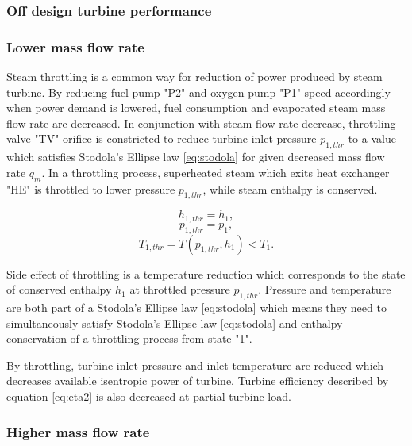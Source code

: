 \documentclass[openany]{book}
\begin{document}
	\subsubsection*{Off design turbine performance}
	
	\subsubsection*{Lower mass flow rate}
	
	Steam throttling is a common way for reduction of power produced by steam 
	turbine. By reducing fuel pump "P2" and oxygen pump "P1" speed accordingly 
	when power demand is lowered, fuel consumption and evaporated steam mass 
	flow rate are decreased. In conjunction with steam flow rate decrease, 
	throttling valve "TV" orifice is constricted to reduce turbine inlet 
	pressure $p_{1,thr}$ to a value which satisfies Stodola’s Ellipse law 
	\ref{eq:stodola} for given decreased mass flow rate $q_m$. In a throttling 
	process, superheated steam which exits heat exchanger "HE" is throttled to 
	lower pressure $p_{1,thr}$, while steam enthalpy is conserved.
	
	\begin{equation}\label{eq:ent_preserve1}
	h_{1,thr} = h_1,
	\end{equation}
	\begin{equation}\label{eq:ent_preserve2}
	p_{1,thr} = p_1,
	\end{equation}
	\begin{equation}\label{eq:ent_preserve3}
	T_{1,thr} = T(p_{1,thr},h_1) < T_1.
	\end{equation}
	
	Side effect of throttling is a temperature reduction which corresponds to 
	the state of conserved enthalpy $h_1$ at throttled pressure $p_{1,thr}$. 
	Pressure and temperature are both part of a Stodola’s Ellipse law 
	\ref{eq:stodola} which means they need to simultaneously satisfy Stodola’s 
	Ellipse law  \ref{eq:stodola}  and enthalpy conservation of a throttling 
	process from state "1".
	
	By throttling, turbine inlet pressure and inlet temperature are reduced 
	which decreases available isentropic power of turbine. Turbine efficiency 
	described by equation \ref{eq:eta2} is also decreased at partial turbine 
	load.
	
	\subsubsection*{Higher mass flow rate}
	
\end{document}
